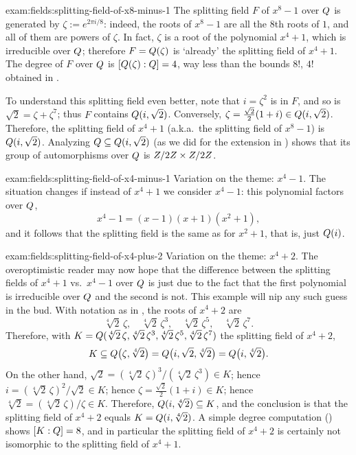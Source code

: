 \begin{exam}{}{exam:fields:splitting-field-of-x8-minus-1}
  The splitting field $F$ of $x^8 - 1$ over $Q$ is generated by
  $\zeta := e^{2\pi i/8}$: indeed, the roots of $x^8 - 1$ are all the
  $8$th roots of $1$, and all of them are powers of $\zeta$. In fact,
  $\zeta$ is a root of the polynomial $x^4 + 1$, which is irreducible
  over $Q$; therefore $F = Q(\zeta)$ is `already' the splitting
  field of $x^4 + 1$. The degree of $F$ over $Q$ is
  $[Q(\zeta) : Q] = 4$, way less than the bounds $8!$, $4 !$
  obtained in .

  To understand this splitting field even better, note that
  $i = \zeta^2$ is in $F$, and so is $\sqrt{2} = \zeta + \zeta^7$;
  thus $F$ contains $Q(i, \sqrt{2})$. Conversely,
  $\zeta = \frac{\sqrt{2}}{2}(1 + i) \in Q(i, \sqrt{2})$. Therefore,
  the splitting field of $x^4 + 1$ (a.k.a.\ the splitting field of
  $x^8 - 1$) is $Q(i, \sqrt{2})$. Analyzing
  $Q \subseteq Q(i, \sqrt{2})$ (as we did for the extension in
  ) shows that its group of automorphisms
  over $Q$ is $Z/2Z \times Z/2Z$.
\end{exam}
\begin{exam}{}{exam:fields:splitting-field-of-x4-minus-1}
  Variation on the theme: $x^4 - 1$. The situation changes if instead
  of $x^4 + 1$ we consider $x^4 - 1$: this polynomial factors over
  $Q$,
  \[
    x^4 - 1 = (x-1)(x+1)(x^2+1),
  \]
  and it follows that the splitting field is the same as for
  $x^2 + 1$, that is, just $Q(i)$.
\end{exam}
\begin{exam}{}{exam:fields:splitting-field-of-x4-plus-2}
  Variation on the theme: $x^4 + 2$. The overoptimistic reader may now
  hope that the difference between the splitting fields of $x^4 + 1$
  vs.\ $x^4 - 1$ over $Q$ is just due to the fact that the first
  polynomial is irreducible over $Q$ and the second is not. This
  example will nip any such guess in the bud. With notation as in
  , the roots of $x^4 + 2$ are
  \[
    \sqrt[4]{2}\,\zeta,\quad \sqrt[4]{2}\,\zeta^3,\quad
    \sqrt[4]{2}\,\zeta^5,\quad \sqrt[4]{2}\,\zeta^7.
  \]
  Therefore, with
  $K = Q(\sqrt[4]{2}\,\zeta, \sqrt[4]{2}\,\zeta^3,
  \sqrt[4]{2}\,\zeta^5, \sqrt[4]{2}\,\zeta^7)$ the splitting field of
  $x^4 + 2$,
  \[
    K \subseteq Q\bigl(\zeta,\sqrt[4]{2}\bigr) =
    Q\bigl(i,\sqrt{2},\sqrt[4]{2}\bigr) =
    Q\bigl(i,\sqrt[4]{2}\bigr).
  \]
  On the other hand,
  $\sqrt{2} = {(\sqrt[4]{2}\,\zeta)}^3/(\sqrt[4]{2}\, \zeta^3) \in K$;
  hence $i = {(\sqrt[4]{2}\,\zeta)}^2/\sqrt{2} \in K$; hence
  $\zeta = \frac{\sqrt{2}}{2}(1+i) \in K$; hence
  $\sqrt[4]{2} = (\sqrt[4]{2}\,\zeta)/\zeta \in K$. Therefore,
  $Q(i, \sqrt[4]{2}) \subseteq K$, and the conclusion is that the
  splitting field of $x^4 + 2$ equals $K = Q(i, \sqrt[4]{2})$. A
  simple degree computation
  () shows
  $[K : Q] = 8$, and in particular the splitting field of $x^4 + 2$
  is certainly not isomorphic to the splitting field of $x^4 + 1$.
\end{exam}
